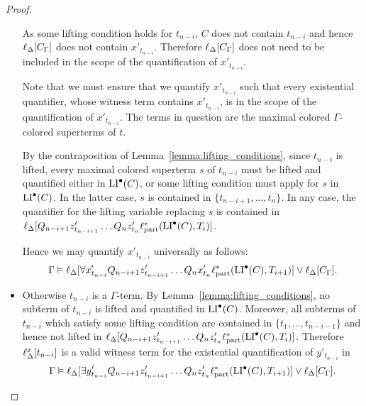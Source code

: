 \begin{proof}
\begin{itemize}
			As some lifting condition holds for $t_{n-i}$, $C$ does not contain $t_{n-i}$ and hence
			$\ell_{\Delta}[C_\Gamma]$ does not contain $x'_{t_{n-i}}$. Therefore $\ell_{\Delta}[C_\Gamma]$ does not need to be included in the scope of the quantification of $x'_{t_{n-i}}$.

			Note that we must ensure that we quantify $x'_{t_{n-i}}$ such that every existential quantifier, whose witness term contains $x'_{t_{n-i}}$, is in the scope of the quantification of $x'_{t_{n-i}}$. 
			The terms in question are the maximal colored $\Gamma$-colored superterms of $t$.

			By the contraposition of Lemma~\ref{lemma:lifting_conditions}, since $t_{n-i}$ is lifted, every maximal colored superterm $s$ of $t_{n-i}$ must be lifted and quantified either in $\operatorname{LI}^\bullet(C)$, or some lifting condition must apply for $s$ in $\operatorname{LI}^\bullet(C)$.
			In the latter case, $s$ is contained in $\{t_{n-i+1},\dots, t_n\}$.
			In any case, the quantifier for the lifting variable replacing $s$ is contained in $\ell_{\Delta}[ Q_{n-i+1} z'_{t_{n-i+1}} \dots Q_n z'_{t_n} \ell_\mathrm{part}^* ( \operatorname{LI}^\bullet(C), T_i )]$.                                 


			Hence we may quantify $x'_{t_{n-i}}$ universally as follows:
			\[\Gamma \vDash \ell_{\Delta}[ \forall x'_{t_{n-i}} Q_{n-i+1} z'_{t_{n-i+1}} \dots Q_n x'_{t_{n}} \ell_\mathrm{part}^*( \operatorname{LI}^\bullet(C), T_{i+1} )] \lor \ell_{\Delta}[C_\Gamma].\]

		\item
			Otherwise $t_{n-i}$ is a $\Gamma$-term.
			By Lemma~\ref{lemma:lifting_conditions}, no subterm of $t_{n-i}$ is lifted and quantified in $\operatorname{LI}^\bullet(C)$.
			Moreover, all subterms of $t_{n-i}$ which satisfy some lifting condition are contained in $\{t_{1}, \dots, t_{n-i-1}\}$
			and hence not lifted in
			$\ell_{\Delta}[ Q_{n-i+1} z'_{t_{n-i+1}} \dots Q_n z'_{t_n} \ell_\mathrm{part}^*( \operatorname{LI}^\bullet(C), T_i )]$.
			Therefore $\ell_{\Delta}^{x}[t_{n-i}]$ is a valid witness term for the existential quantification of $y'_{t_{n-i}}$ in
			\[\Gamma \vDash \ell_{\Delta}[ \exists y'_{t_{n-i}} Q_{n-i+1} z'_{t_{n-i+1}} \dots Q_n z'_{t_n}  \ell_\mathrm{part}^*( \operatorname{LI}^\bullet(C), T_{i+1} )] \lor \ell_{\Delta}[C_\Gamma].\]



\end{itemize}
\end{proof}
